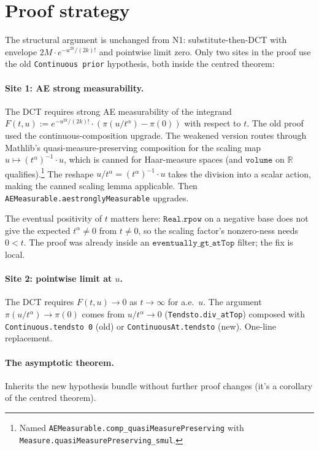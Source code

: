 \documentclass[11pt]{article}
\begin{document}
\section{Proof strategy}

The structural argument is unchanged from N1: substitute-then-DCT
with envelope $2M \cdot e^{-u^{2k}/(2k)!}$ and pointwise limit zero.
Only two sites in the proof use the old \texttt{Continuous prior}
hypothesis, both inside the centred theorem:

\paragraph{Site 1: AE strong measurability.} The DCT requires
strong AE measurability of the integrand
$F(t, u) := e^{-u^{2k}/(2k)!} \cdot (\pi(u/t^\alpha) - \pi(0))$
with respect to $t$. The old proof used the continuous-composition
upgrade. The weakened version routes through Mathlib's
quasi-measure-preserving composition for the scaling map
$u \mapsto (t^\alpha)^{-1} \cdot u$, which is canned for Haar-measure
spaces (and $\texttt{volume}$ on $\mathbb R$ qualifies).\footnote{Named
\texttt{AEMeasurable.comp\_quasiMeasurePreserving} with
\texttt{Measure.quasiMeasurePreserving\_smul}.} The reshape
$u / t^\alpha = (t^\alpha)^{-1} \cdot u$ takes the division into a
scalar action, making the canned scaling lemma applicable. Then
\texttt{AEMeasurable.aestronglyMeasurable} upgrades.

The eventual positivity of $t$ matters here:
$\texttt{Real.rpow}$ on a negative base does not give the expected
$t^\alpha \ne 0$ from $t \ne 0$, so the scaling factor's
nonzero-ness needs $0 < t$. The proof was already inside an
$\texttt{eventually\_gt\_atTop}$ filter; the fix is local.

\paragraph{Site 2: pointwise limit at $u$.} The DCT requires
$F(t, u) \to 0$ as $t \to \infty$ for a.e.\ $u$. The argument
$\pi(u/t^\alpha) \to \pi(0)$ comes from
$u/t^\alpha \to 0$ (\texttt{Tendsto.div\_atTop}) composed with
\texttt{Continuous.tendsto 0} (old) or
\texttt{ContinuousAt.tendsto} (new). One-line replacement.

\paragraph{The asymptotic theorem.} Inherits the new hypothesis bundle
without further proof changes (it's a corollary of the centred
theorem).
\end{document}
